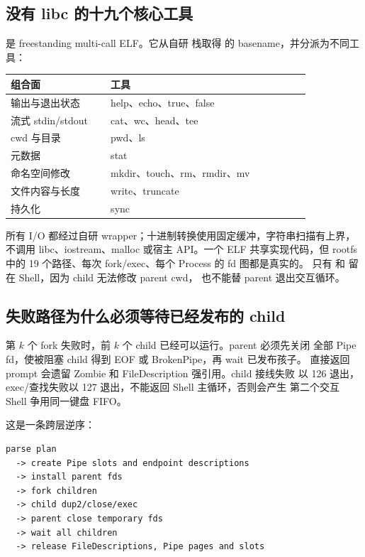 \subsection{没有 libc 的十九个核心工具}

 是 freestanding multi-call ELF。它从自研
 栈取得  的 basename，并分派为不同工具：

\begin{center}
\begin{tabular}{L{0.28\linewidth}L{0.56\linewidth}}
\toprule
组合面 & 工具 \\
\midrule
输出与退出状态 & help、echo、true、false \\
流式 stdin/stdout & cat、wc、head、tee \\
cwd 与目录 & pwd、ls \\
元数据 & stat \\
命名空间修改 & mkdir、touch、rm、rmdir、mv \\
文件内容与长度 & write、truncate \\
持久化 & sync \\
\bottomrule
\end{tabular}
\end{center}

所有 I/O 都经过自研 wrapper；十进制转换使用固定缓冲，字符串扫描有上界，
不调用 libc、iostream、malloc 或宿主 API。一个 ELF 共享实现代码，但
rootfs 中的 19 个路径、每次 fork/exec、每个 Process 的 fd 图都是真实的。
只有  和  留在 Shell，因为 child 无法修改 parent cwd，
也不能替 parent 退出交互循环。

\subsection{失败路径为什么必须等待已经发布的 child}

第 \(k\) 个 fork 失败时，前 \(k\) 个 child 已经可以运行。parent 必须先关闭
全部 Pipe fd，使被阻塞 child 得到 EOF 或 BrokenPipe，再 wait 已发布孩子。
直接返回 prompt 会遗留 Zombie 和 FileDescription 强引用。child 接线失败
以 126 退出，exec/查找失败以 127 退出，不能返回 Shell 主循环，否则会产生
第二个交互 Shell 争用同一键盘 FIFO。

这是一条跨层逆序：

\begin{verbatim}
parse plan
  -> create Pipe slots and endpoint descriptions
  -> install parent fds
  -> fork children
  -> child dup2/close/exec
  -> parent close temporary fds
  -> wait all children
  -> release FileDescriptions, Pipe pages and slots
\end{verbatim}

